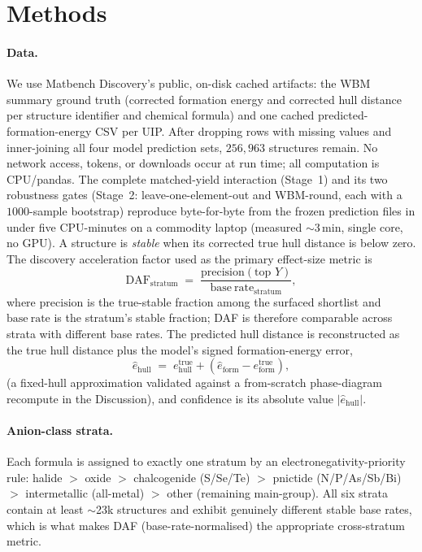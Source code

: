 \documentclass[aip,jcp,preprint,superscriptaddress,amsmath,amssymb]{revtex4-2}
\begin{document}
\section{Methods}

\paragraph{Data.} We use Matbench Discovery's public, on-disk cached artifacts: the
WBM summary ground truth (corrected formation energy and corrected hull distance per
structure identifier and chemical formula) and one cached predicted-formation-energy CSV per
UIP. After dropping rows with missing values and inner-joining all four model prediction sets,
$256{,}963$ structures remain. No network access, tokens, or downloads occur at run time;
all computation is CPU/pandas. The complete matched-yield interaction (Stage~1) and its two
robustness gates (Stage~2: leave-one-element-out and WBM-round, each with a $1000$-sample
bootstrap) reproduce byte-for-byte from the frozen prediction files in under five CPU-minutes
on a commodity laptop (measured $\sim$3\,min, single core, no GPU). A structure is \emph{stable}
when its corrected true hull
distance is below zero. The discovery acceleration factor used as the primary effect-size
metric is
\[
  \mathrm{DAF}_{\mathrm{stratum}} \;=\; \frac{\mathrm{precision}(\text{top } Y)}{\mathrm{base\ rate}_{\mathrm{stratum}}},
\]
where $\mathrm{precision}$ is the true-stable fraction among the surfaced shortlist and
$\mathrm{base\ rate}$ is the stratum's stable fraction; DAF is therefore comparable across
strata with different base rates. The predicted hull distance is reconstructed as
the true hull distance plus the model's signed formation-energy error,
\[
  \hat{e}_{\mathrm{hull}} \;=\; e_{\mathrm{hull}}^{\mathrm{true}} + (\hat{e}_{\mathrm{form}} - e_{\mathrm{form}}^{\mathrm{true}}),
\]
(a fixed-hull approximation validated against a from-scratch phase-diagram recompute in
the Discussion), and confidence is its absolute value $|\hat{e}_{\mathrm{hull}}|$.

\paragraph{Anion-class strata.} Each formula is assigned to exactly one stratum by an
electronegativity-priority rule: halide $>$ oxide $>$ chalcogenide (S/Se/Te) $>$ pnictide
(N/P/As/Sb/Bi) $>$ intermetallic (all-metal) $>$ other (remaining main-group). All six strata
contain at least $\sim$23k structures and exhibit genuinely different stable base rates,
which is what makes DAF (base-rate-normalised) the appropriate cross-stratum metric.
\end{document}
